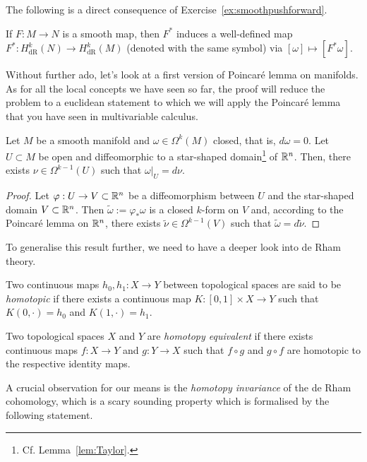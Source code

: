 The following is a direct consequence of Exercise~\ref{ex:smoothpushforward}.

\begin{corollary}
If $F:M\to N$ is a smooth map, then $F^*$ induces a well-defined map $F^*:H_{\mathrm{dR}}^k(N) \to H_{\mathrm{dR}}^k(M)$ (denoted with the same symbol) via $[\omega]\mapsto[F^*\omega]$.
\end{corollary}

Without further ado, let's look at a first version of Poincar\'e lemma on manifolds.
As for all the local concepts we have seen so far, the proof will reduce the problem to a euclidean statement to which we will apply the Poincar\'e lemma that you have seen in multivariable calculus.

\begin{theorem}
  Let $M$ be a smooth manifold and $\omega\in\Omega^k(M)$ closed, that is, $d\omega = 0$.
  Let $U\subset M$ be open and diffeomorphic to a star-shaped domain\footnote{Cf. Lemma~\ref{lem:Taylor}.} of $\mathbb{R}^n$.
  Then, there exists $\nu\in\Omega^{k-1}(U)$ such that $\omega|_U = d\nu$.
\end{theorem}
\begin{proof}
Let $\varphi: U \to V\subset\mathbb{R}^n$ be a diffeomorphism between $U$ and the star-shaped domain $V\subset\mathbb{R}^n$.
Then $\widetilde\omega := \varphi_*\omega$ is a closed $k$-form on $V$ and, according to the Poincar\'e lemma on $\mathbb{R}^n$, there exists $\widetilde \nu \in \Omega^{k-1}(V)$ such that $\widetilde\omega = d\widetilde\nu$.
\end{proof}

To generalise this result further, we need to have a deeper look into de Rham theory.

\begin{definition}
  Two continuous maps $h_0, h_1:X\to Y$ between topological spaces are said to be \emph{homotopic} if there exists a continuous map $K: [0,1]\times X\to Y$ such that $K(0, \cdot) = h_0$ and $K(1,\cdot) = h_1$.

  Two topological spaces $X$ and $Y$ are \emph{homotopy equivalent} if there exists continuous maps $f:X\to Y$ and $g:Y\to X$ such that $f\circ g$ and $g\circ f$ are homotopic to the respective identity maps.
\end{definition}

A crucial observation for our means is the \emph{homotopy invariance} of the de Rham cohomology, which is a scary sounding property which is formalised by the following statement.

